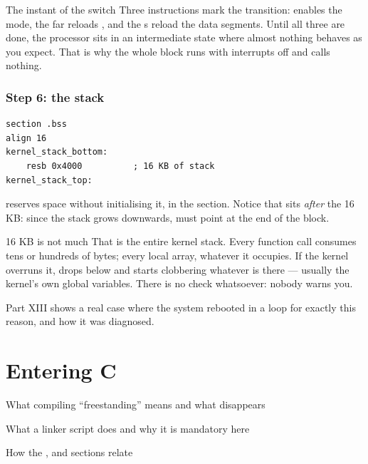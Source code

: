 \begin{concept}{The instant of the switch}
Three instructions mark the transition:  enables the mode, the far 
reloads , and the s reload the data segments. Until all three are done, the
processor sits in an intermediate state where almost nothing behaves as you expect. That is why the
whole block runs with interrupts off and calls nothing.
\end{concept}

\subsection{Step 6: the stack}

\begin{lstlisting}[style=asm]
section .bss
align 16
kernel_stack_bottom:
    resb 0x4000          ; 16 KB of stack
kernel_stack_top:
\end{lstlisting}

 reserves space without initialising it, in the  section. Notice that
 sits \emph{after} the 16 KB: since the stack grows downwards, 
must point at the end of the block.

\begin{danger}{16 KB is not much}
That is the entire kernel stack. Every function call consumes tens or hundreds of bytes; every
local array, whatever it occupies. If the kernel overruns it,  drops below
 and starts clobbering whatever is there --- usually the kernel's own
global variables. There is no check whatsoever: nobody warns you.

Part XIII shows a real case where the system rebooted in a loop for exactly this reason, and how it
was diagnosed.
\end{danger}

\chapter{Entering C}

\begin{goals}
  \item What compiling ``freestanding'' means and what disappears
  \item What a linker script does and why it is mandatory here
  \item How the ,  and  sections relate
\end{goals}

